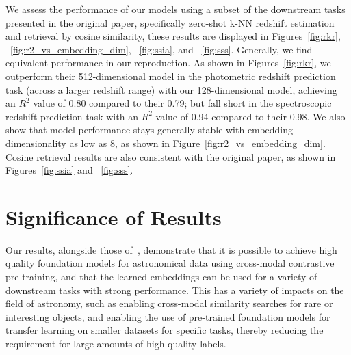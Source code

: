 \documentclass[a4paper,11pt]{article}
\begin{document}
We assess the performance of our models using a subset of the downstream tasks presented in the original paper, specifically
zero-shot k-NN redshift estimation and retrieval by cosine similarity, these results are displayed in Figures~\eqref{fig:rkr},
~\eqref{fig:r2_vs_embedding_dim}, ~\eqref{fig:ssia}, and ~\eqref{fig:sss}.
Generally, we find equivalent performance in our reproduction.
As shown in Figures~\eqref{fig:rkr}, we outperform their 512-dimensional model in the photometric redshift prediction task
(across a larger redshift range) with our 128-dimensional model, achieving an $R^{2}$ value of 0.80 compared to their 0.79; but
fall short in the spectroscopic redshift prediction task with an $R^{2}$ value of 0.94 compared to their 0.98.
We also show that model performance stays generally stable with embedding dimensionality as low as 8, as shown in
Figure~\eqref{fig:r2_vs_embedding_dim}.
Cosine retrieval results are also consistent with the original paper, as shown in Figures~\eqref{fig:ssia} and ~\eqref{fig:sss}.

\section{Significance of Results}\label{sec:conclusion}
Our results, alongside those of~\cite{astroclip}, demonstrate that it is possible to achieve high quality foundation
models for astronomical data using cross-modal contrastive pre-training, and that the learned embeddings can be used for a variety
of downstream tasks with strong performance.
This has a variety of impacts on the field of astronomy, such as enabling cross-modal similarity searches for rare or interesting
objects, and enabling the use of pre-trained foundation models for transfer learning on smaller datasets for specific tasks,
thereby reducing the requirement for large amounts of high quality labels.


\clearpage



\clearpage


\end{document}
